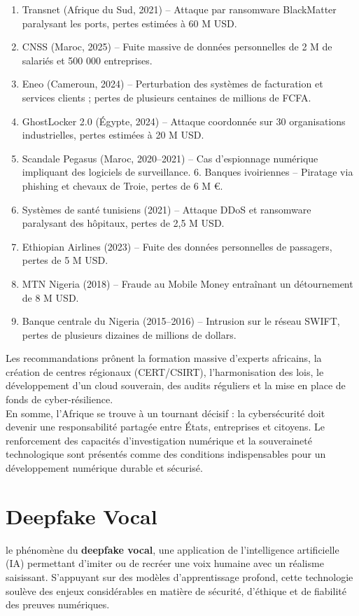 \documentclass[12pt, a4em]{article}
\begin{document}
	\begin{enumerate}
	\item Transnet (Afrique du Sud, 2021) – Attaque par ransomware BlackMatter paralysant les ports, pertes estimées à 60 M USD.
	\item CNSS (Maroc, 2025) – Fuite massive de données personnelles de 2 M de salariés et 500 000 entreprises.
	\item Eneo (Cameroun, 2024) – Perturbation des systèmes de facturation et services clients ; pertes de plusieurs centaines de millions de FCFA.
	\item GhostLocker 2.0 (Égypte, 2024) – Attaque coordonnée sur 30 organisations industrielles, pertes estimées à 20 M USD.
	\item Scandale Pegasus (Maroc, 2020–2021) – Cas d’espionnage numérique impliquant des logiciels de surveillance.
	6.	Banques ivoiriennes – Piratage via phishing et chevaux de Troie, pertes de 6 M €.
	\item 	Systèmes de santé tunisiens (2021) – Attaque DDoS et ransomware paralysant des hôpitaux, pertes de 2,5 M USD.
	\item Ethiopian Airlines (2023) – Fuite des données personnelles de passagers, pertes de 5 M USD.
	\item MTN Nigeria (2018) – Fraude au Mobile Money entraînant un détournement de 8 M USD.
	\item 	Banque centrale du Nigeria (2015–2016) – Intrusion sur le réseau SWIFT, pertes de plusieurs dizaines de millions de dollars.
	
\end{enumerate}
	Les recommandations prônent la formation massive d’experts africains, la création de centres régionaux (CERT/CSIRT), l’harmonisation des lois, le développement d’un cloud souverain, des audits réguliers et la mise en place de fonds de cyber-résilience.\\
	En somme, l’Afrique se trouve à un tournant décisif : la cybersécurité doit devenir une responsabilité partagée entre États, entreprises et citoyens. Le renforcement des capacités d’investigation numérique et la souveraineté technologique sont présentés comme des conditions indispensables pour un développement numérique durable et sécurisé.
	
	
	\section{Deepfake Vocal}
	
	le phénomène du \textbf{deepfake vocal}, une application de l’intelligence artificielle (IA) permettant d’imiter ou de recréer une voix humaine avec un réalisme saisissant. 
	S’appuyant sur des modèles d’apprentissage profond, cette technologie soulève des enjeux considérables en matière de sécurité, d’éthique et de fiabilité des preuves numériques.
	
\end{document}
